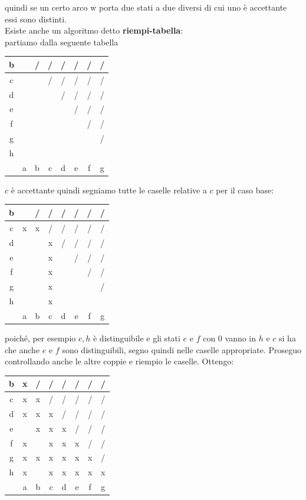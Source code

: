 quindi se un certo arco w porta due stati a due diversi di cui uno è accettante essi sono distinti.\\
Esiste anche un algoritmo detto \textbf{riempi-tabella}:\\
partiamo dalla seguente tabella
\begin{center}
	\begin{tabular}{c|c|c|c|c|c|c|c|}
		\hline
		b &   & / & / & / & / & / & / \\
		\hline
		c &   &   & / & / & / & / & / \\
		\hline
		d &   &   &   & / & / & / & / \\
		\hline
		e &   &   &   &   & / & / & / \\
		\hline
		f &   &   &   &   &   & / & / \\
		\hline
		g &   &   &   &   &   &   & / \\
		\hline
		h &   &   &   &   &   &   &   \\
		\hline
		  & a & b & c & d & e & f & g \\
		\hline
	\end{tabular}
\end{center}
$c$ è accettante quindi segniamo tutte le caselle relative a $c$ per il caso base:
\begin{center}
	\begin{tabular}{c|c|c|c|c|c|c|c|}
		\hline
		b &   & / & / & / & / & / & / \\
		\hline
		c & x & x & / & / & / & / & / \\
		\hline
		d &   &   & x & / & / & / & / \\
		\hline
		e &   &   & x &   & / & / & / \\
		\hline
		f &   &   & x &   &   & / & / \\
		\hline
		g &   &   & x &   &   &   & / \\
		\hline
		h &   &   & x &   &   &   &   \\
		\hline
		  & a & b & c & d & e & f & g \\
		\hline
	\end{tabular}
\end{center}
poiché, per esempio $c,h$ è distinguibile e gli stati $e$ e $f$ con 0 vanno in $h$ e $c$ si ha che anche $e$ e $f$ sono distinguibili, segno quindi nelle caselle appropriate. Proseguo controllando anche le altre coppie e riempio le caselle. Ottengo:
\begin{center}
	\begin{tabular}{c|c|c|c|c|c|c|c|}
		\hline
		b & x & / & / & / & / & / & / \\
		\hline
		c & x & x & / & / & / & / & / \\
		\hline
		d & x & x & x & / & / & / & / \\
		\hline
		e &   & x & x & x & / & / & / \\
		\hline
		f & x &   & x & x & x & / & / \\
		\hline
		g & x & x & x & x & x & x & / \\
		\hline
		h & x &   & x & x & x & x & x \\
		\hline
		  & a & b & c & d & e & f & g \\
		\hline
	\end{tabular}
\end{center}
